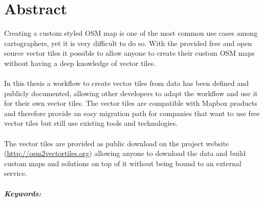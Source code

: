 

\begingroup
\let\clearpage\relax
\let\cleardoublepage\relax
\let\cleardoublepage\relax

\chapter*{Abstract} %

Creating a custom styled OSM map is one of the most common use cases
among cartographers, yet it is very difficult to do so. With the provided 
free and open source vector tiles it possible to allow anyone to
create their custom OSM maps without having a deep knowledge of vector tiles.
\\\\
In this thesis a workflow to create vector tiles from \osm{} data has been defined and publicly documented, allowing other developers to adapt the workflow and use it for their own vector tiles.
The vector tiles are compatible with Mapbox products and therefore provide an easy migration path for companies that want to use free vector tiles but still use existing tools and technologies.
\\\\
The vector tiles are provided as public download on the project website (\url{http://osm2vectortiles.org}) allowing anyone to download the data and build custom maps and solutions on top of it without being bound to an external service.

\endgroup			

\paragraph{Keywords:}\mbox{}\\
\textit{\myKeywords}

\vfill

